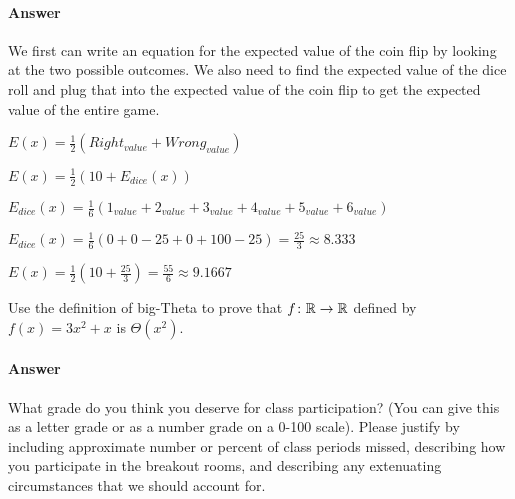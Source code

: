 \documentclass{article}
\begin{document}
\begin{enumerate}
        \paragraph{Answer} We first can write an equation for the expected value of the coin flip by looking at the two possible outcomes. We also need to find the expected value of the dice roll and plug that into the expected value of the coin flip to get the expected value of the entire game.
        
        $E(x) = \frac{1}{2}(Right_{value} + Wrong_{value})$
        
        $E(x) = \frac{1}{2}(10 + E_{dice}(x))$
        
        $E_{dice}(x) = \frac{1}{6}(1_{value} + 2_{value} + 3_{value} + 4_{value} + 5_{value} + 6_{value})$
        
        $E_{dice}(x) = \frac{1}{6}(0 + 0 - 25 + 0 + 100 - 25) = \frac{25}{3} \approx 8.333$
        
        $E(x) = \frac{1}{2}(10 + \frac{25}{3}) = \frac{55}{6} \approx 9.1667$
        
\end{enumerate}

\collab{\todo{}} 

Use the definition of big-Theta to prove that $f \colon {\mathbb R} \to {\mathbb R}$ defined by
$f(x) = 3x^2+x$ is $\Theta(x^2)$.

\paragraph{Answer}



\collab{\todo{}} 

What grade do you think you deserve for class participation? (You can give this
as a letter grade or as a number grade on a 0-100 scale). Please justify by
including approximate number or percent of class periods missed, describing how
you participate in the breakout rooms, and describing any extenuating
circumstances that we should account for.
\end{document}
